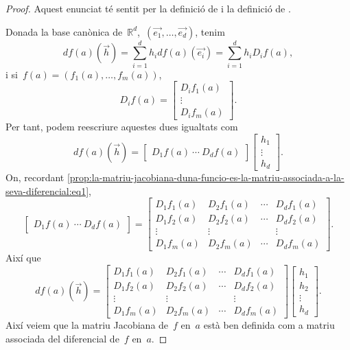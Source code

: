 \documentclass[../calcul-en-diverses-variables.tex]{subfiles}
\begin{document}
    \begin{proof}
        Aquest enunciat té sentit per la definició de  i la definició de .

        Donada la base canònica de~\(\mathbb{R}^{d}\),~\((\vec{e_{1}},\dots,\vec{e_{d}})\), tenim
        \[
            df(a)(\vec{h})=\sum_{i=1}^{d}h_{i}df(a)(\vec{e_{i}})=\sum_{i=1}^{d}h_{i}D_{i}f(a),
        \]
        i si~\(f(a)=(f_{1}(a),\dots,f_{m}(a))\),
        \begin{equation}\label{prop:la-matriu-jacobiana-duna-funcio-es-la-matriu-associada-a-la-seva-diferencial:eq1}
        D_{i}f(a)=
        \left[\begin{matrix}
        D_{i}f_{1}(a)\\
        \vdots\\
        D_{i}f_{m}(a)
        \end{matrix}\right].
        \end{equation}
        Per tant, podem reescriure aquestes dues igualtats com
        \[df(a)(\vec{h})=
        \left[\begin{matrix}
        D_{1}f(a)~\cdots~D_{d}f(a)
        \end{matrix}\right]
        \left[\begin{matrix}
        h_{1}\\\vdots\\h_{d}
        \end{matrix}
        \right].\]
        On, recordant \eqref{prop:la-matriu-jacobiana-duna-funcio-es-la-matriu-associada-a-la-seva-diferencial:eq1},
        \[\left[\begin{matrix}
        D_{1}f(a)~\cdots~D_{d}f(a)
        \end{matrix}\right]=
        \left[\begin{matrix}
        D_{1}f_{1}(a) & D_{2}f_{1}(a) & \cdots & D_{d}f_{1}(a)\\
        D_{1}f_{2}(a) & D_{2}f_{2}(a) & \cdots & D_{d}f_{2}(a)\\
        \vdots & \vdots && \vdots \\
        D_{1}f_{m}(a) & D_{2}f_{m}(a) & \cdots & D_{d}f_{m}(a)
        \end{matrix}\right].\]
        Així que
        \[df(a)(\vec{h})=
        \left[\begin{matrix}
        D_{1}f_{1}(a) & D_{2}f_{1}(a) & \cdots & D_{d}f_{1}(a)\\
        D_{1}f_{2}(a) & D_{2}f_{2}(a) & \cdots & D_{d}f_{2}(a)\\
        \vdots & \vdots && \vdots \\
        D_{1}f_{m}(a) & D_{2}f_{m}(a) & \cdots & D_{d}f_{m}(a)
        \end{matrix}\right]
        \left[\begin{matrix}
        h_{1}\\h_{2}\\\vdots\\h_{d}
        \end{matrix}
        \right].\]
        Així veiem que la matriu Jacobiana de~\(f\) en~\(a\) està ben definida com a matriu associada del diferencial de~\(f\) en~\(a\).
    \end{proof}
\end{document}
